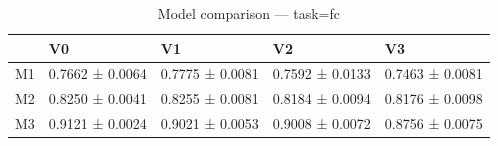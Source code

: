 \begin{table}[htbp]
\centering
\caption{Model comparison — task=fc}
\label{tab:models:fc}
\begin{tabular}{lllll}
\toprule
\toprule
 & V0 & V1 & V2 & V3 \\
\midrule
\midrule
M1 & 0.7662 ± 0.0064 & 0.7775 ± 0.0081 & 0.7592 ± 0.0133 & 0.7463 ± 0.0081 \\
M2 & 0.8250 ± 0.0041 & 0.8255 ± 0.0081 & 0.8184 ± 0.0094 & 0.8176 ± 0.0098 \\
M3 & 0.9121 ± 0.0024 & 0.9021 ± 0.0053 & 0.9008 ± 0.0072 & 0.8756 ± 0.0075 \\
\bottomrule
\end{tabular}\end{table}
